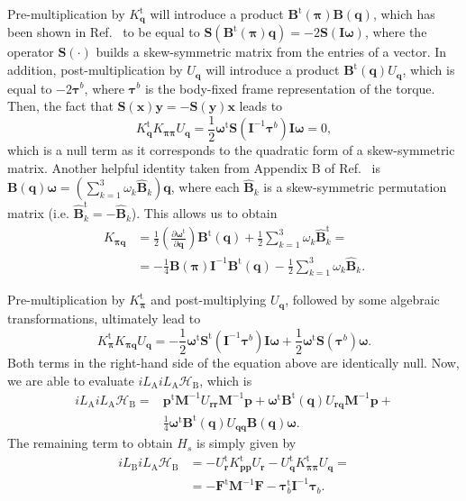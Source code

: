 \documentclass[
journal=jctcce,
layout=twocolumn
]{achemso}
\newcommand{\mt}[1]{\boldsymbol{\mathbf{#1}}}   %
\newcommand{\vt}[1]{\boldsymbol{\mathbf{#1}}}   %
\newcommand{\tr}[1]{#1^\text{t}}                %
\newcommand{\diff}[2]{\frac{\partial #1}{\partial #2}} %
\newcommand{\Ham}[1]{{\mathcal H}_\text{#1}}    %
\newcommand{\Liu}[1]{i\!L_\text{#1}}            %
\begin{document}
Pre-multiplication by $\tr{K_{\vt q}}$ will introduce a product $\tr{\mt B}(\vt \pi) {\mt B}(\vt q)$, which has been shown in Ref.~ to be equal to ${\mt S}\left( \tr{\mt B}(\vt \pi) {\vt q} \right) = -2 {\mt S}({\mt I} {\vt \omega})$, where the operator ${\mt S}(\cdot)$ builds a skew-symmetric matrix from the entries of a vector.
In addition, post-multiplication by $U_{\vt q}$ will introduce a product $\tr{\mt B}(\vt q) U_{\vt q}$, which is equal to $-2 {\vt \tau}^b$, where ${\vt \tau}^b$ is the body-fixed frame representation of the torque.
Then, the fact that ${\mt S}(\vt x) {\vt y} = -{\mt S}(\vt y) {\vt x}$ leads to
\begin{equation*}
\tr{K_{\vt q}} K_{\vt \pi \vt \pi} U_{\vt q} = \frac{1}{2} \tr{\vt \omega} {\mt S}({\mt I}^{-1} {\vt \tau}^b) {\mt I} {\vt \omega} = 0,
\end{equation*}
which is a null term as it corresponds to the quadratic form of a skew-symmetric matrix.
Another helpful identity taken from Appendix B of Ref.~ is ${\mt B}(\vt q){\vt \omega} = ( \sum_{k=1}^3 \omega_k \hat{\mt B}_k ) \vt q$, where each $\hat{\mt B}_k$ is a skew-symmetric permutation matrix (i.e.
$\tr{\hat{\mt B}}_k = -\hat{\mt B}_k$).
This allows us to obtain
\begin{align*}
K_{\vt \pi \vt q} &= \frac{1}{2} (\diff{\tr{\vt \omega}}{\vt q}) \tr{\mt B}(\vt q) + \frac{1}{2} \sum_{k=1}^3 \omega_k \tr{\hat{\mt B}}_k = \\
&= -\frac{1}{4} {\mt B}(\vt \pi) {\mt I}^{-1} \tr{\mt B}(\vt q) - \frac{1}{2} \sum_{k=1}^3 \omega_k \hat{\mt B}_k.
\end{align*}

Pre-multiplication by $\tr{K_{\vt \pi}}$ and post-multiplying $U_{\vt q}$, followed by some algebraic transformations, ultimately lead to
\begin{equation*}
\tr{K_{\vt \pi}} K_{\vt \pi \vt q} U_{\vt q} = -\frac{1}{2} \tr{\vt \omega} \tr{\mt S}({\mt I}^{-1} {\vt \tau}^b) {\mt I} {\vt \omega} + \frac{1}{2} \tr{\vt \omega} {\mt S}({\vt \tau}^b){\vt \omega}.
\end{equation*}
Both terms in the right-hand side of the equation above are identically null. 
Now, we are able to evaluate $\Liu A \Liu A \Ham B $, which is
\begin{align*}
\Liu A \Liu A \Ham B = &\tr{\vt p} {\mt M}^{-1} U_{\vt r \vt r} {\mt M}^{-1} {\vt p} + \tr{\vt \omega} \tr{\mt B}(\vt q) U_{\vt r \vt q} {\mt M}^{-1} {\vt p}
+ \\
&\frac{1}{4} \tr{\vt \omega} \tr{\mt B}(\vt q) U_{\vt q \vt q} {\mt B}(\vt q) \vt \omega.
\end{align*}
The remaining term to obtain $H_s$ is simply given by 
\begin{align*}
\Liu B \Liu A \Ham B &= -\tr{U_{\vt r}} \tr{K_{\vt p \vt p}} U_{\vt r} - \tr{U_{\vt q}} \tr{K_{\vt \pi \vt \pi}} U_{\vt q} = \\
&= -\tr{\vt F} {\mt M}^{-1} {\vt F} - \tr{\vt \tau}_b {\mt I}^{-1} {\vt \tau}_b.
\end{align*}
\end{document}
